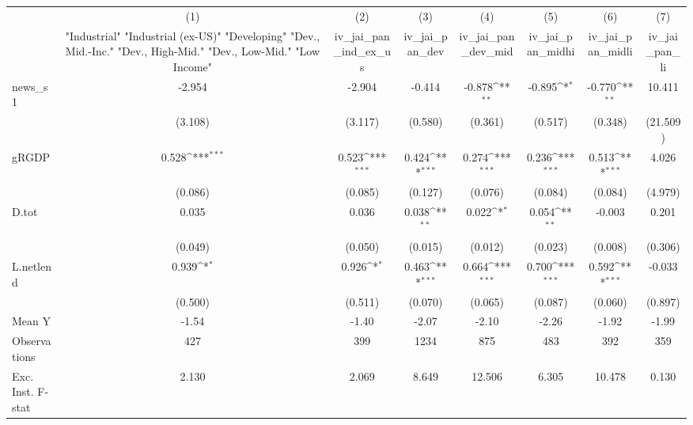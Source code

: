 {
\def\sym#1{\ifmmode^{#1}\else\(^{#1}\)\fi}
\begin{tabular}{l*{7}{c}}
\toprule
            &\multicolumn{1}{c}{(1)}&\multicolumn{1}{c}{(2)}&\multicolumn{1}{c}{(3)}&\multicolumn{1}{c}{(4)}&\multicolumn{1}{c}{(5)}&\multicolumn{1}{c}{(6)}&\multicolumn{1}{c}{(7)}\\
            &\multicolumn{1}{c}{ "Industrial" "Industrial (ex-US)" "Developing" "Dev., Mid.-Inc." "Dev., High-Mid."  "Dev., Low-Mid." "Low Income" }&\multicolumn{1}{c}{iv\_jai\_pan\_ind\_ex\_us}&\multicolumn{1}{c}{iv\_jai\_pan\_dev}&\multicolumn{1}{c}{iv\_jai\_pan\_dev\_mid}&\multicolumn{1}{c}{iv\_jai\_pan\_midhi}&\multicolumn{1}{c}{iv\_jai\_pan\_midli}&\multicolumn{1}{c}{iv\_jai\_pan\_li}\\
\midrule
news\_s1     &      -2.954         &      -2.904         &      -0.414         &      -0.878\sym{**} &      -0.895\sym{*}  &      -0.770\sym{**} &      10.411         \\
            &     (3.108)         &     (3.117)         &     (0.580)         &     (0.361)         &     (0.517)         &     (0.348)         &    (21.509)         \\
\addlinespace
gRGDP       &       0.528\sym{***}&       0.523\sym{***}&       0.424\sym{***}&       0.274\sym{***}&       0.236\sym{***}&       0.513\sym{***}&       4.026         \\
            &     (0.086)         &     (0.085)         &     (0.127)         &     (0.076)         &     (0.084)         &     (0.084)         &     (4.979)         \\
\addlinespace
D.tot       &       0.035         &       0.036         &       0.038\sym{**} &       0.022\sym{*}  &       0.054\sym{**} &      -0.003         &       0.201         \\
            &     (0.049)         &     (0.050)         &     (0.015)         &     (0.012)         &     (0.023)         &     (0.008)         &     (0.306)         \\
\addlinespace
L.netlend   &       0.939\sym{*}  &       0.926\sym{*}  &       0.463\sym{***}&       0.664\sym{***}&       0.700\sym{***}&       0.592\sym{***}&      -0.033         \\
            &     (0.500)         &     (0.511)         &     (0.070)         &     (0.065)         &     (0.087)         &     (0.060)         &     (0.897)         \\
\midrule
Mean Y      &       -1.54         &       -1.40         &       -2.07         &       -2.10         &       -2.26         &       -1.92         &       -1.99         \\
Observations&         427         &         399         &        1234         &         875         &         483         &         392         &         359         \\
Exc. Inst. F-stat&       2.130         &       2.069         &       8.649         &      12.506         &       6.305         &      10.478         &       0.130         \\
\bottomrule
\end{tabular}
}
